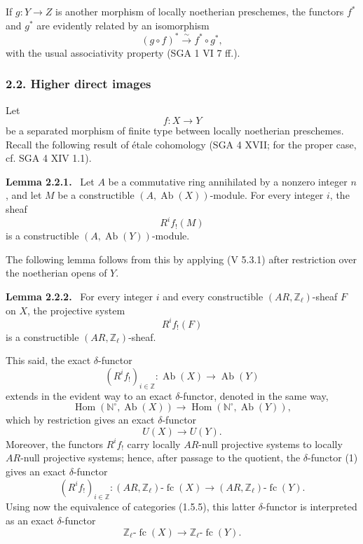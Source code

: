 \documentclass[11pt]{article}
\newenvironment{statement}[1]{\par\medskip\noindent\textbf{#1.}\ }{\par\medskip}
\DeclareMathOperator{\Hom}{Hom}
\providecommand{\Hom}{\operatorname{Hom}}
\providecommand{\Ab}{\operatorname{Ab}}
\providecommand{\fc}{\operatorname{fc}}
\providecommand{\Ab}{\operatorname{Ab}}
\providecommand{\Hom}{\operatorname{Hom}}
\begin{document}
If \(g:Y\to Z\) is another morphism of locally noetherian preschemes, the functors \(f^*\) and \(g^*\) are evidently related by an isomorphism
\[
(g\circ f)^*\xrightarrow{\sim}f^*\circ g^*,
\]
with the usual associativity property (SGA 1 VI 7 ff.).

\subsubsection*{2.2. Higher direct images}

Let
\[
f:X\longrightarrow Y
\]
be a separated morphism of finite type between locally noetherian preschemes. Recall the following result of étale cohomology (SGA 4 XVII; for the proper case, cf. SGA 4 XIV 1.1).

\begin{statement}{Lemma 2.2.1}
Let \(A\) be a commutative ring annihilated by a nonzero integer \(n\), and let \(M\) be a constructible \((A,\Ab(X))\)-module. For every integer \(i\), the sheaf
\[
R^if_!(M)
\]
is a constructible \((A,\Ab(Y))\)-module.
\end{statement}

The following lemma follows from this by applying (V 5.3.1) after restriction over the noetherian opens of \(Y\).

\begin{statement}{Lemma 2.2.2}
For every integer \(i\) and every constructible \((AR,\mathbb Z_\ell)\)-sheaf \(F\) on \(X\), the projective system
\[
R^if_!(F)
\]
is a constructible \((AR,\mathbb Z_\ell)\)-sheaf.
\end{statement}

This said, the exact \(\delta\)-functor
\[
(R^if_!)_{i\in\mathbb Z}:\Ab(X)\longrightarrow \Ab(Y)
\]
extends in the evident way to an exact \(\delta\)-functor, denoted in the same way,
\[
\Hom(\mathbb N^\circ,\Ab(X))\longrightarrow \Hom(\mathbb N^\circ,\Ab(Y)),
\]
which by restriction gives an exact \(\delta\)-functor
\[
U(X)\longrightarrow U(Y).
\tag{1}
\]
Moreover, the functors \(R^if_!\) carry locally \(AR\)-null projective systems to locally \(AR\)-null projective systems; hence, after passage to the quotient, the \(\delta\)-functor (1) gives an exact \(\delta\)-functor
\[
(R^if_!)_{i\in\mathbb Z}:(AR,\mathbb Z_\ell)\text{-}\fc(X)
\longrightarrow (AR,\mathbb Z_\ell)\text{-}\fc(Y).
\]
Using now the equivalence of categories (1.5.5), this latter \(\delta\)-functor is interpreted as an exact \(\delta\)-functor
\[
\mathbb Z_\ell\text{-}\fc(X)\longrightarrow \mathbb Z_\ell\text{-}\fc(Y).
\]
\end{document}
